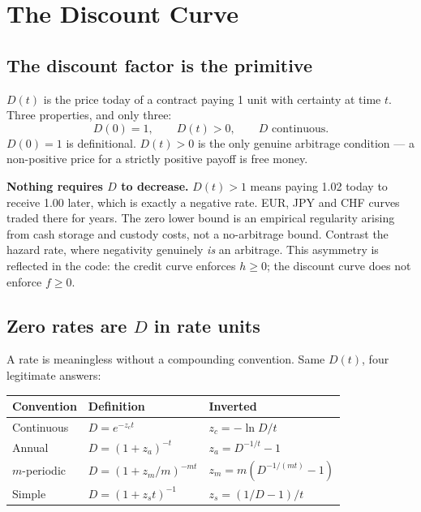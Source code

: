 \documentclass[11pt,a4paper]{article}
\newcommand{\keypoint}[1]{%
  \par\vspace{0.4em}\noindent
  \colorbox{codebg}{\parbox{\dimexpr\linewidth-2\fboxsep}{\small #1}}%
  \par\vspace{0.5em}}
\begin{document}
\newpage
\section{The Discount Curve}

\subsection{The discount factor is the primitive}

$D(t)$ is the price today of a contract paying 1 unit with certainty at time $t$. Three
properties, and only three:
\[
D(0) = 1, \qquad D(t) > 0, \qquad D \text{ continuous.}
\]
$D(0)=1$ is definitional. $D(t) > 0$ is the only genuine arbitrage condition --- a
non-positive price for a strictly positive payoff is free money.

\keypoint{\textbf{Nothing requires $D$ to decrease.} $D(t) > 1$ means paying 1.02 today to
receive 1.00 later, which is exactly a negative rate. EUR, JPY and CHF curves traded there
for years. The zero lower bound is an empirical regularity arising from cash storage and
custody costs, not a no-arbitrage bound. Contrast the hazard rate, where negativity
genuinely \emph{is} an arbitrage. This asymmetry is reflected in the code: the credit curve
enforces $h \ge 0$; the discount curve does not enforce $f \ge 0$.}

\subsection{Zero rates are $D$ in rate units}

A rate is meaningless without a compounding convention. Same $D(t)$, four legitimate answers:

\begin{center}
\begin{tabular}{lll}
\toprule
\textbf{Convention} & \textbf{Definition} & \textbf{Inverted} \\
\midrule
Continuous   & $D = e^{-z_c t}$              & $z_c = -\ln D / t$ \\
Annual       & $D = (1+z_a)^{-t}$            & $z_a = D^{-1/t} - 1$ \\
$m$-periodic & $D = (1 + z_m/m)^{-mt}$       & $z_m = m\left(D^{-1/(mt)} - 1\right)$ \\
Simple       & $D = (1 + z_s t)^{-1}$        & $z_s = (1/D - 1)/t$ \\
\bottomrule
\end{tabular}
\end{center}
\end{document}
